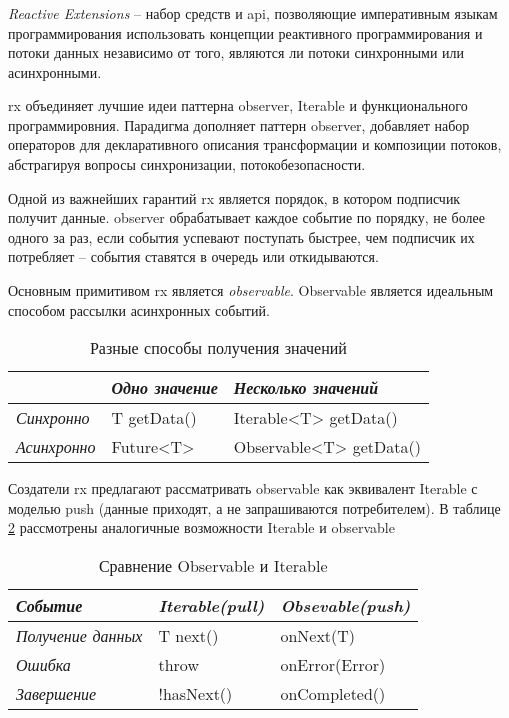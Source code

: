 \subsubsection{}
\label{sec:analysis:research:mobArch:rx}

\emph{Reactive Extensions} -- набор средств и \gls{api}, позволяющие императивным языкам программирования использовать концепции реактивного программирования и потоки данных независимо от того, являются ли потоки синхронными или асинхронными\cite{wiki:rx}.

\gls{rx} объединяет лучшие идеи паттерна \gls{observer}, Iterable и функционального программировния. Парадигма дополняет паттерн \gls{observer}, добавляет набор операторов для декларативного описания трансформации и композиции потоков, абстрагируя вопросы синхронизации, потокобезопасности.

Одной из важнейших гарантий \gls{rx} является порядок, в котором подписчик получит данные. \gls{observer} обрабатывает каждое событие по порядку, не более одного за раз, если события успевают поступать быстрее, чем подписчик их потребляет -- события ставятся в очередь или откидываются.

Основным примитивом \gls{rx} является \emph{\gls{observable}}. Observable является идеальным способом рассылки асинхронных событий\cite{programming-in-haskell}.

\begin{table}[h!]
\caption{Разные способы получения значений}
\label{theory:archeticture:rx:call}
\centering
\begin{tabularx}{\textwidth}{ |X|X|X| } 
 \hline
  & \emph{Одно значение} & \emph{Несколько значений} \\ 
 \hline
 \emph{Синхронно} & T getData() & Iterable<T> getData() \\ 
 \hline
 \emph{Асинхронно} & Future<T> & Observable<T> getData() \\ 
 \hline
\end{tabularx}
\end{table}

Создатели \gls{rx} предлагают\cite{reactivex:introduction} рассматривать \gls{observable} как эквивалент Iterable с моделью push (данные приходят, а не запрашиваются потребителем). В таблице \ref{theory:archeticture:rx:iterable-observable} рассмотрены аналогичные возможности Iterable и \gls{observable}

\begin{table}[h!]
\caption{Сравнение Observable и Iterable}
\label{theory:archeticture:rx:iterable-observable}
\centering
\begin{tabularx}{\textwidth}{ |X|X|X| } 
 \hline
 \emph{Событие} & \emph{Iterable(pull)} & \emph{Obsevable(push)} \\ 
 \hline
 \emph{Получение данных} & T next() & onNext(T) \\ 
 \hline
 \emph{Ошибка} & throw & onError(Error) \\ 
 \hline
  \emph{Завершение} & !hasNext() & onCompleted() \\ 
 \hline
\end{tabularx}
\end{table}

